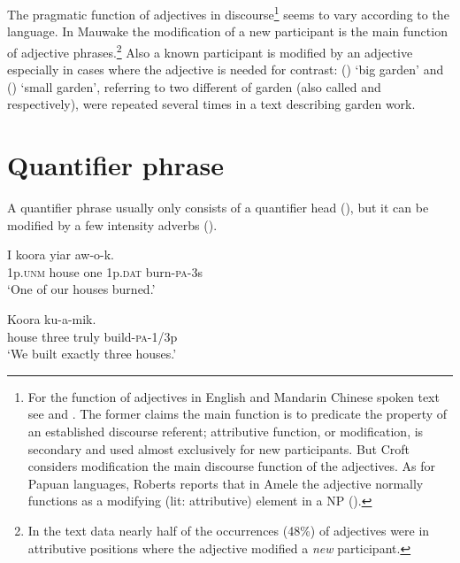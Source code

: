   

The pragmatic function of adjectives in discourse\footnote{For the function of adjectives in English and Mandarin Chinese spoken text see \citet{Thompson1988} and \citet{Croft1991}. The former claims the main function is to predicate the property of an established discourse referent; attributive function, or modification, is secondary and used almost exclusively for new participants. But Croft considers modification the main discourse function of the adjectives.  As for Papuan languages, Roberts reports that in Amele the adjective normally functions as a modifying (lit: attributive) element in a NP (\citeyear[318]{Roberts1987}).} seems to vary according to the language. In Mauwake the modification of a new participant is the main function of adjective phrases.\footnote{In the text data nearly half of the occurrences (48\%) of adjectives were in attributive positions where the adjective modified a \textit{new} participant.} Also a known participant is modified by an adjective especially in cases where the adjective is needed for contrast: ()  `big garden' and () \textstyleEmphasizedWords{} `small garden', referring to two different  of garden (also called  and  respectively), were repeated several times in a text describing garden work. 

\section{Quantifier phrase}
{}
A quantifier phrase usually only consists of a quantifier head  (), but it can be modified by a few intensity adverbs  (). 

\ea%
\label{ex:4:x845}
\gll I  koora    yiar  aw-o-k. \\
    1p.\textsc{unm}  house  one  1p.\textsc{dat}  burn-\textsc{pa}-3s  \\
\glt`One of our houses burned.'
\z

\ea%
\label{ex:4:x844}
\gll Koora     ku-a-mik. \\
   house  three  truly  build-\textsc{pa}-1/3p   \\
\glt`We built exactly three houses.'
\z

